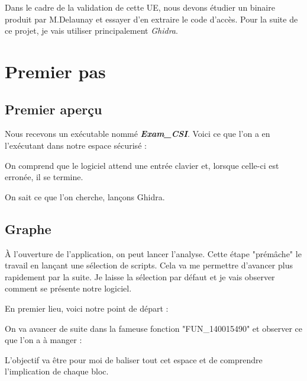 \documentclass{rapport}
\begin{document}
Dans le cadre de la validation de cette UE, nous devons étudier un binaire produit par M.Delaunay et essayer d'en extraire le code d’accès. Pour la suite de ce projet, je vais utiliser principalement \textit{Ghidra}.\bigbreak


\newpage
\section{Premier pas}

\subsection{Premier aperçu}

\hspace{18pt}Nous recevons un exécutable nommé \textbf{\textit{Exam\_CSI}}. Voici ce que l'on a en l’exécutant dans notre espace sécurisé :

On comprend que le logiciel attend une entrée clavier et, lorsque celle-ci est erronée, il se termine.

On sait ce que l'on cherche, lançons Ghidra.

\subsection{Graphe}

\hspace{18pt}À l'ouverture de l'application, on peut lancer l'analyse. Cette étape "prémâche" le travail en lançant une sélection de scripts. Cela va me permettre d'avancer plus rapidement par la suite. Je laisse la sélection par défaut et je vais observer comment se présente notre logiciel.

\hspace{18pt}En premier lieu, voici notre point de départ :

\hspace{18pt}On va avancer de suite dans la fameuse fonction "FUN\_140015490" et observer ce que l'on a à manger :

\smallbreak

\hspace{18pt}L'objectif va être pour moi de baliser tout cet espace et de comprendre l'implication de chaque bloc.
\vspace{4em}
\end{document}
